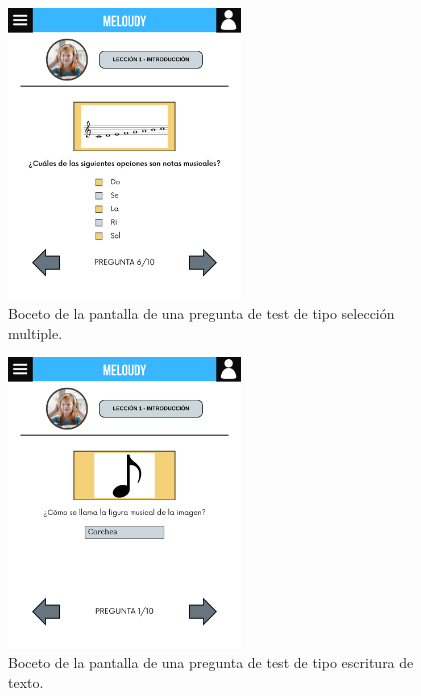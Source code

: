 \begin{figure}[H]
    \centering
    \centerline{\includegraphics[width=0.55\textwidth, frame]{imagenes/c6/6.png}}
    \caption{Boceto de la pantalla de una pregunta de test de tipo selección multiple.}
    \label{fig:seleccionmultiple}
\end{figure}

\begin{figure}[H]
    \centering
    \centerline{\includegraphics[width=0.55\textwidth, frame]{imagenes/c6/7.png}}
    \caption{Boceto de la pantalla de una pregunta de test de tipo escritura de texto.}
    \label{fig:escrituratexto}
\end{figure}

